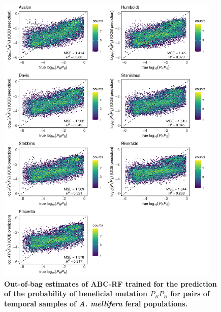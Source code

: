 \documentclass[a4paper, 12pt]{article}
\begin{document}
\begin{figure}[ht]
  \centering
  \includegraphics[width=0.95\textwidth]{Figures/FigureS17_combined_plot_prps.pdf}
  \small\caption{\textbf{Out-of-bag estimates of ABC-RF trained for the prediction of the probability of beneficial mutation $P_RP_B$ for pairs of temporal samples of \textit{A. mellifera} feral populations.}}
  \label{fig:supple_feralbee_prpb}
\end{figure}
\end{document}
